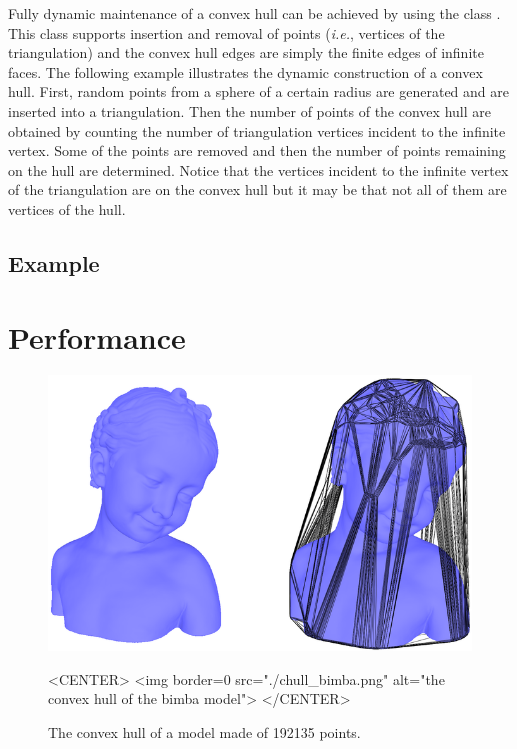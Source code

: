 Fully dynamic maintenance of a convex hull can be achieved by using the
class .  This class supports insertion
and removal of points (\textit{i.e.}, vertices of the triangulation) and the 
convex hull edges are simply the finite edges of infinite faces.  
The following example illustrates the dynamic construction of a convex hull.
First, random points from a sphere of a certain radius are generated and are
inserted into a triangulation.  Then the number of points of the convex hull 
are obtained by counting the number of triangulation vertices incident to the 
infinite vertex.  Some of the points are removed and then the number of points 
remaining on the hull are determined.  Notice that the vertices incident to the
infinite vertex of the triangulation are on the convex hull but it may be that
not all of them are vertices of the hull.

\subsection{Example}

\section{Performance}

\begin{figure}
\begin{ccTexOnly}
\begin{center}
\includegraphics[width=12cm]{Convex_hull_3/chull_bimba.png}
\end{center}
\end{ccTexOnly}
\begin{ccHtmlOnly}
<CENTER>
<img border=0 src="./chull_bimba.png" alt="the convex hull of the bimba model">
</CENTER>
\end{ccHtmlOnly}
\caption{The convex hull of a model made of 192135 points.
\label{fig-ch-bimba}}
\end{figure}

